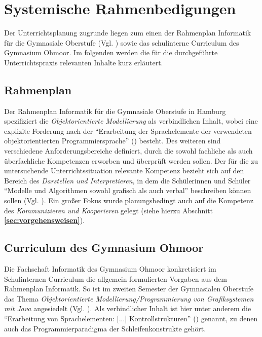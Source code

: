 \documentclass[paper=a4, DIV=13, BCOR=12mm, twoside=on, onecolumn=on, open = any, titlepage =on, parskip =half-, headsepline = on, footsepline = on, chapterprefix = on, sectionprefix = on, appendixprefix = off, fontsize = 11pt, numbers = noenddot, abstract = off]{scrreprt}
\begin{document}
\section{Systemische Rahmenbedigungen}
\onehalfspacing
Der Unterrichtsplanung zugrunde liegen zum einen der Rahmenplan Informatik für die Gymnasiale Oberstufe (Vgl. \cite{oberstufe:09}) sowie das schulinterne Curriculum des Gymnasium Ohmoor. Im folgenden werden die für die durchgeführte Unterrichtspraxis relevanten Inhalte kurz erläutert.
\subsection{Rahmenplan}
Der Rahmenplan Informatik für die Gymnasiale Oberstufe in Hamburg spezifiziert die \textit{Objektorientierte Modellierung} als verbindlichen Inhalt, wobei eine explizite Forderung nach der "`Erarbeitung der Sprachelemente der verwendeten objektorientierten Programmiersprache"' (\cite[S. 17]{oberstufe:09}) besteht. Des weiteren sind verschiedene Anforderungsbereiche definiert, durch die sowohl fachliche als auch überfachliche Kompetenzen erworben und überprüft werden sollen. Der für die zu untersuchende Unterrichtssituation relevante Kompetenz bezieht sich auf den Bereich des \textit{Darstellen und Interpretieren}, in dem die Schülerinnen und Schüler "`Modelle und Algorithmen sowohl grafisch als auch verbal"' beschreiben können sollen (Vgl. \cite[S.16]{oberstufe:09}). Ein großer Fokus wurde planungsbedingt auch auf die Kompetenz des \textit{Kommunizieren und Kooperieren} gelegt (siehe hierzu Abschnitt \textbf{\ref{sec:vorgehensweisen}}).

\par \singlespacing
\subsection{Curriculum des Gymnasium Ohmoor}
\onehalfspacing
Die Fachschaft Informatik des Gymnasium Ohmoor konkretisiert im Schulinternen Curriculum die allgemein formulierten Vorgaben aus dem Rahmenplan Informatik. So ist im zweiten Semester der Gymnasialen Oberstufe das Thema \textit{Objektorientierte Modellierung/Programmierung von Grafiksystemen mit Java} angesiedelt (Vgl. \cite[S.6f.]{ohmoor:16}). Als verbindlicher Inhalt ist hier unter anderem die "`Erarbeitung von Sprachelementen: [...] Kontrollstrukturen"' (\cite[S.7]{ohmoor:16}) genannt, zu denen auch das Programmierparadigma der Schleifenkonstrukte gehört.

\par \singlespacing
\end{document}
